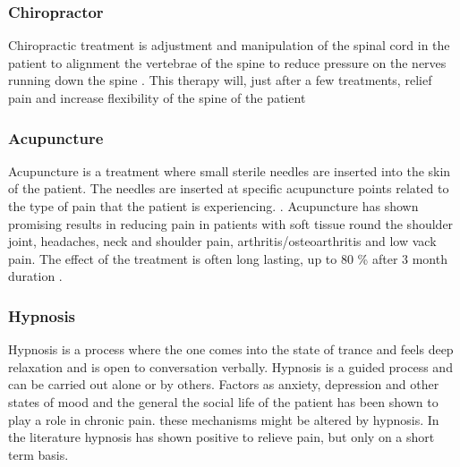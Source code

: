 \subsubsection{Chiropractor}
Chiropractic treatment is adjustment and manipulation of the spinal cord in the patient to alignment the vertebrae of the spine to reduce pressure on the nerves running down the spine \cite{Gerald2013}. This therapy will, just after a few treatments, relief pain and increase flexibility of the spine of the patient  \cite{Peterson2012}

\subsubsection{Acupuncture}
Acupuncture is a treatment where small sterile needles are inserted into the skin of the patient. The needles are inserted at specific acupuncture points related to the type of pain that the patient is experiencing. \cite{Dhanani2011}. Acupuncture has shown promising results in reducing pain in patients with soft tissue round the shoulder joint, headaches, neck and shoulder pain, arthritis/osteoarthritis and low vack pain. The effect of the treatment is often long lasting, up to 80 \% after 3 month duration \cite{Junnilla1983}. 

\subsubsection{Hypnosis}
Hypnosis is a process where the one comes into the state of trance and feels deep relaxation and is open to conversation verbally. Hypnosis is a guided process and can be carried out alone or by others. \cite{Gerald2013} Factors as anxiety, depression and other states of mood and the general the social life of the patient has been shown to play a role in chronic pain. these mechanisms might be altered by hypnosis.
In the literature hypnosis has shown positive to relieve pain, but only on a short term basis. \cite{Dhanani2011}

